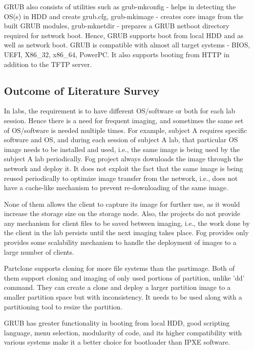 \documentclass[a4paper,12pt]{article}
\begin{document}
GRUB also consists of utilities such as grub-mkconfig - helps in detecting the OS(s) in HDD and create grub.cfg, grub-mkimage - creates core image from the built GRUB modules, grub-mknetdir - prepares a GRUB netboot directory required for network boot. Hence, GRUB supports boot from local HDD and as well as network boot. GRUB is compatible with almost all target systems - BIOS, UEFI, X86\_32, x86\_64, PowerPC. It also supports booting from HTTP in addition to the TFTP server.

\subsection{ Outcome of Literature Survey}
In labs, the requirement is to have different OS/software or both for each lab session. Hence there is a need for frequent imaging, and sometimes the same set of OS/software is needed multiple times. For example, subject A requires specific software and OS, and during each session of subject A lab, that particular OS image needs to be installed and used, i.e., the same image is being used by the subject A lab periodically. Fog project always downloads the image through the network and deploy it. It does not exploit the fact that the same image is being reused periodically to optimize image transfer from the network, i.e., does not have a cache-like mechanism to prevent re-downloading of the same image.

None of them allows the client to capture its image for further use, as it would increase the storage size on the storage node. Also,  the projects do not provide any mechanism for client files to be saved between imaging, i.e., the work done by the client in the lab persists until the next imaging takes place. Fog provides only provides some scalability mechanism to handle the deployment of images to a large number of clients.  

Partclone supports cloning for more file systems than the partimage. Both of them support cloning and imaging of only used portions of partition, unlike 'dd' command. They can create a clone and deploy a larger partition image to a smaller partition space but with inconsistency. It needs to be used along with a partitioning tool to resize the partition.

GRUB has greater functionality in booting from local HDD, good scripting language, menu selection, modularity of code, and its higher compatibility with various systems make it a better choice for bootloader than IPXE software.
\end{document}
